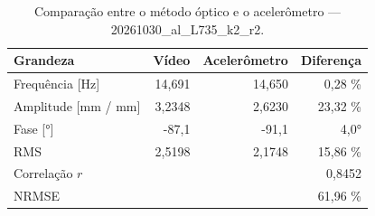 \begin{table}[htbp]
  \centering
  \caption{Comparação entre o método óptico e o acelerômetro — 20261030\_al\_L735\_k2\_r2.}
  \label{tab:comp_20261030_al_L735_k2_r2}
  \begin{tabular}{lrrr}
    \toprule
    Grandeza & Vídeo & Acelerômetro & Diferença \\
    \midrule
    Frequência [Hz] & 14{,}691 & 14{,}650 & 0{,}28 \% \\
    Amplitude [mm / mm] & 3{,}2348 & 2{,}6230 & 23{,}32 \% \\
    Fase [°] & -87{,}1 & -91{,}1 & 4{,}0° \\
    RMS & 2{,}5198 & 2{,}1748 & 15{,}86 \% \\
    Correlação $r$ &  &  & 0{,}8452 \\
    NRMSE &  &  & 61{,}96 \% \\
    \bottomrule
  \end{tabular}
\end{table}

